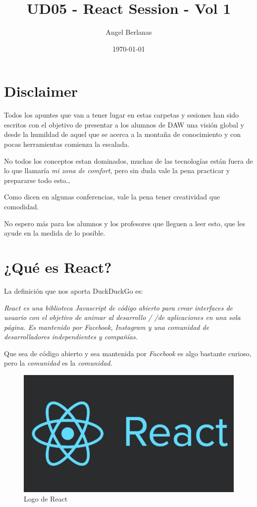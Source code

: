 \documentclass[11pt]{article}
\author{Angel Berlanas}
\date{\today}
\title{UD05 - React Session - Vol 1}
\begin{document}
\maketitle
\tableofcontents


\section{Disclaimer}
\label{sec:org3ed8ffc}

Todos los apuntes que van a tener lugar en estas carpetas y sesiones 
han sido escritos con el objetivo de presentar a los alumnos de DAW una visión 
global y desde la humildad de aquel que se acerca a la montaña de conocimiento 
y con pocas herramientas comienza la escalada.

No todos los conceptos estan dominados, muchas de las tecnologías están fuera
de lo que llamaría \emph{mi zona de comfort}, pero sin duda vale la pena practicar
y prepararse todo esto\ldots{} 

Como dicen en algunas conferencias, vale la pena tener creatividad que
comodidad.

No espero más para los alumnos y los profesores que lleguen a leer esto, que
les ayude en la medida de lo posible.

\section{¿Qué es React?}
\label{sec:org678cfa2}

La definición que nos aporta DuckDuckGo es: 

\emph{React es una biblioteca Javascript de código abierto para crear}
\emph{interfaces de usuario con el objetivo de animar al desarrollo /
/de aplicaciones en una sola  página. Es mantenido por Facebook,}
\emph{Instagram y una comunidad de}
\emph{desarrolladores independientes y compañías.}

Que sea de código abierto y sea mantenida por \emph{Facebook} es algo bastante
curioso, pero la \emph{comunidad} es la \emph{comunidad}.

\begin{figure}[htbp]
\centering
\includegraphics[width=.9\linewidth]{./imgs/react-logo.png}
\caption{Logo de React}
\end{figure}
\end{document}
